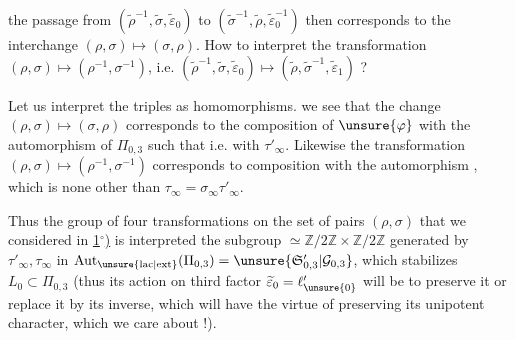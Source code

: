 
the passage from $(\widetilde\rho^{-1},\widetilde\sigma,\widetilde\varepsilon_0)$ to $(\widetilde\sigma^{-1},\widetilde\rho,\widetilde\varepsilon_0^{-1})$ then corresponds to the interchange $(\rho,\sigma)\mapsto(\sigma,\rho)$. How  to interpret the transformation $(\rho,\sigma)\mapsto(\rho^{-1},\sigma^{-1})$, i.e. $(\widetilde\rho^{-1},\widetilde\sigma,\widetilde\varepsilon_0)\mapsto(\widetilde\rho,\widetilde\sigma^{-1},\widetilde\varepsilon_1)$ ?

Let us interpret the triples as homomorphisms.
we see that the change $(\rho,\sigma)\mapsto(\sigma,\rho)$ corresponds to the composition of $\unsure{\varphi}$ with the automorphism of $\Pi_{0,3}$ such that
i.e. with \uline{$\tau'_\infty$}. Likewise the transformation $(\rho,\sigma)\mapsto(\rho^{-1},\sigma^{-1})$ corresponds to composition with the automorphism
,
which is none other than \uline{$\tau_\infty$}$=\sigma_\infty\tau'_\infty$.

Thus the group of four transformations  on the set of pairs $(\rho,\sigma)$ that we considered in \uline{1$^\circ$)} is interpreted   the subgroup $\simeq\mathbb Z/2\mathbb Z\times\mathbb Z/2\mathbb Z$ generated by $\tau'_\infty,\tau_\infty$ in $\operatorname{Aut}_{\unsure{\mathrm{lac}|\mathrm{ext}}}(\Pi_{0,3})=\unsure{\mathfrak S'_{0,3}|\mathcal G_{0,3}}$, which  stabilizes $L_0\subset\Pi_{0,3}$ (thus its action on  third factor $\widetilde\varepsilon_0=\ell'_{\unsure{0}}$ will be to preserve it or replace it by its inverse,  which will have the virtue of  preserving its unipotent character, which we care about !).


